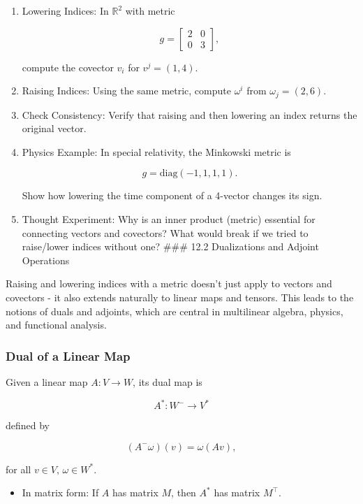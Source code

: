 \documentclass[
  letterpaper,
  DIV=11,
  numbers=noendperiod]{scrreprt}
\providecommand{\tightlist}{%
  \setlength{\itemsep}{0pt}\setlength{\parskip}{0pt}}
\begin{document}
\begin{enumerate}
\def\labelenumi{\arabic{enumi}.}
\item
  Lowering Indices: In \(\mathbb{R}^2\) with metric

  \[
  g = \begin{bmatrix}2 & 0 \\ 0 & 3\end{bmatrix},
  \]

  compute the covector \(v_i\) for \(v^j = (1,4)\).
\item
  Raising Indices: Using the same metric, compute \(\omega^i\) from
  \(\omega_j = (2,6)\).
\item
  Check Consistency: Verify that raising and then lowering an index
  returns the original vector.
\item
  Physics Example: In special relativity, the Minkowski metric is

  \[
  g = \mathrm{diag}(-1,1,1,1).
  \]

  Show how lowering the time component of a 4-vector changes its sign.
\item
  Thought Experiment: Why is an inner product (metric) essential for
  connecting vectors and covectors? What would break if we tried to
  raise/lower indices without one? \#\#\# 12.2 Dualizations and Adjoint
  Operations
\end{enumerate}

Raising and lowering indices with a metric doesn't just apply to vectors
and covectors - it also extends naturally to linear maps and tensors.
This leads to the notions of duals and adjoints, which are central in
multilinear algebra, physics, and functional analysis.

\subsubsection{Dual of a Linear Map}\label{dual-of-a-linear-map}

Given a linear map \(A: V \to W\), its dual map is

\[
A^*: W^- \to V^*
\]

defined by

\[
(A^- \omega)(v) = \omega(Av),
\]

for all \(v \in V, \, \omega \in W^*\).

\begin{itemize}
\tightlist
\item
  In matrix form: If \(A\) has matrix \(M\), then \(A^*\) has matrix
  \(M^\top\).
\end{itemize}
\end{document}
